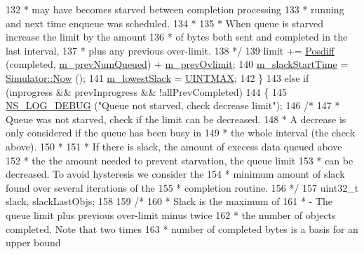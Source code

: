 \begin{DoxyCode}
132 \textcolor{comment}{      *     may have becomes starved between completion processing}
133 \textcolor{comment}{      *     running and next time enqueue was scheduled.}
134 \textcolor{comment}{      *}
135 \textcolor{comment}{      *     When queue is starved increase the limit by the amount}
136 \textcolor{comment}{      *     of bytes both sent and completed in the last interval,}
137 \textcolor{comment}{      *     plus any previous over-limit.}
138 \textcolor{comment}{      */}
139       limit += \hyperlink{classns3_1_1DynamicQueueLimits_ab4177a222243fb17528c5dfeb1f6c7da}{Posdiff} (completed, \hyperlink{classns3_1_1DynamicQueueLimits_a88d80e7cd24b67993d9416ff0c7fd75d}{m\_prevNumQueued}) + 
      \hyperlink{classns3_1_1DynamicQueueLimits_a63d5c451bd659754d9968445e5c3a1b9}{m\_prevOvlimit};
140       \hyperlink{classns3_1_1DynamicQueueLimits_a4e63a333752db6ccdaa6c232c4f5433b}{m\_slackStartTime} = \hyperlink{classns3_1_1Simulator_ac3178fa975b419f7875e7105be122800}{Simulator::Now} ();
141       \hyperlink{classns3_1_1DynamicQueueLimits_ab47105c4df36adf2512a8fbc3fd4da4d}{m\_lowestSlack} = \hyperlink{dynamic-queue-limits_8cc_a3f63b751e6af68c85a8282699067ba2f}{UINTMAX};
142     \}
143   \textcolor{keywordflow}{else} \textcolor{keywordflow}{if} (inprogress && prevInprogress && !allPrevCompleted)
144     \{
145       \hyperlink{group__logging_ga413f1886406d49f59a6a0a89b77b4d0a}{NS\_LOG\_DEBUG} (\textcolor{stringliteral}{"Queue not starved, check decrease limit"});
146      \textcolor{comment}{/*}
147 \textcolor{comment}{      * Queue was not starved, check if the limit can be decreased.}
148 \textcolor{comment}{      * A decrease is only considered if the queue has been busy in}
149 \textcolor{comment}{      * the whole interval (the check above).}
150 \textcolor{comment}{      *}
151 \textcolor{comment}{      * If there is slack, the amount of execess data queued above}
152 \textcolor{comment}{      * the the amount needed to prevent starvation, the queue limit}
153 \textcolor{comment}{      * can be decreased.  To avoid hysteresis we consider the}
154 \textcolor{comment}{      * minimum amount of slack found over several iterations of the}
155 \textcolor{comment}{      * completion routine.}
156 \textcolor{comment}{      */}
157       uint32\_t slack, slackLastObjs;
158 
159      \textcolor{comment}{/*}
160 \textcolor{comment}{      * Slack is the maximum of}
161 \textcolor{comment}{      *   - The queue limit plus previous over-limit minus twice}
162 \textcolor{comment}{      *     the number of objects completed.  Note that two times}
163 \textcolor{comment}{      *     number of completed bytes is a basis for an upper bound}

\end{DoxyCode}
